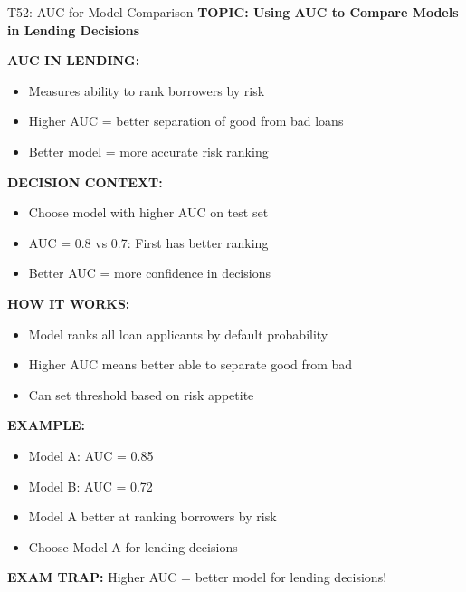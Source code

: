 \documentclass[8pt]{beamer}
\begin{document}
	\begin{frame}{T52: AUC for Model Comparison}
		\fontsize{6.5}{7.5}\selectfont
		\textbf{TOPIC: Using AUC to Compare Models in Lending Decisions}
		
		\vspace{0.1cm}
		\textbf{AUC IN LENDING:}
		\begin{itemize}
			\item Measures ability to rank borrowers by risk
			\item Higher AUC = better separation of good from bad loans
			\item Better model = more accurate risk ranking
		\end{itemize}
		
		\vspace{0.1cm}
		\textbf{DECISION CONTEXT:}
		\begin{itemize}
			\item Choose model with higher AUC on test set
			\item AUC = 0.8 vs 0.7: First has better ranking
			\item Better AUC = more confidence in decisions
		\end{itemize}
		
		\vspace{0.1cm}
		\textbf{HOW IT WORKS:}
		\begin{itemize}
			\item Model ranks all loan applicants by default probability
			\item Higher AUC means better able to separate good from bad
			\item Can set threshold based on risk appetite
		\end{itemize}
		
		\vspace{0.1cm}
		\textbf{EXAMPLE:}
		\begin{itemize}
			\item Model A: AUC = 0.85
			\item Model B: AUC = 0.72
			\item Model A better at ranking borrowers by risk
			\item Choose Model A for lending decisions
		\end{itemize}
		
		\textcolor{myred}{\textbf{EXAM TRAP:}} Higher AUC = \textcolor{myblue}{better model} for lending decisions!
	\end{frame}
	
\end{document}
